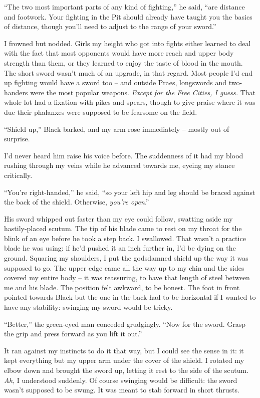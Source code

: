 \documentclass[12pt, openany]{book}
\begin{document}
“The two most important parts of any kind of fighting,” he said, “are distance and footwork. Your fighting in the Pit should already have taught you the basics of distance, though you’ll need to adjust to the range of your sword.”

I frowned but nodded. Girls my height who got into fights either learned to deal with the fact that most opponents would have more reach and upper body strength than them, or they learned to enjoy the taste of blood in the mouth. The short sword wasn’t much of an upgrade, in that regard. Most people I’d end up fighting would have a sword too – and outside Praes, longswords and two-handers were the most popular weapons. \textit{Except for the Free Cities, I guess.} That whole lot had a fixation with pikes and spears, though to give praise where it was due their phalanxes were supposed to be fearsome on the field.

“Shield up,” Black barked, and my arm rose immediately – mostly out of surprise.

I’d never heard him raise his voice before. The suddenness of it had my blood rushing through my veins while he advanced towards me, eyeing my stance critically.

“You’re right-handed,” he said, “so your left hip and leg should be braced against the back of the shield. Otherwise, \textit{you’re open}.”

His sword whipped out faster than my eye could follow, swatting aside my hastily-placed scutum. The tip of his blade came to rest on my throat for the blink of an eye before he took a step back. I swallowed. That wasn’t a practice blade he was using: if he’d pushed it an inch further in, I’d be dying on the ground. Squaring my shoulders, I put the godsdamned shield up the way it was supposed to go. The upper edge came all the way up to my chin and the sides covered my entire body – it was reassuring, to have that length of steel between me and his blade. The position felt awkward, to be honest. The foot in front pointed towards Black but the one in the back had to be horizontal if I wanted to have any stability: swinging my sword would be tricky.

“Better,” the green-eyed man conceded grudgingly. “Now for the sword. Grasp the grip and press forward as you lift it out.”

It ran against my instincts to do it that way, but I could see the sense in it: it kept everything but my upper arm under the cover of the shield. I rotated my elbow down and brought the sword up, letting it rest to the side of the scutum. \textit{Ah}, I understood suddenly. Of course swinging would be difficult: the sword wasn’t supposed to be swung. It was meant to stab forward in short thrusts.
\end{document}
